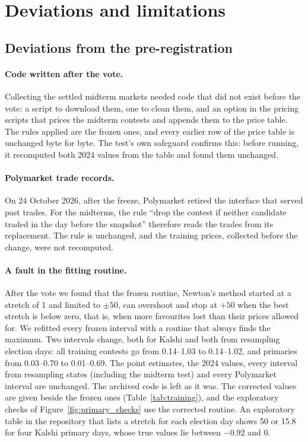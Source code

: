 \section{Deviations and limitations}\label{sec:limitations}

\subsection{Deviations from the pre-registration}

\paragraph{Code written after the vote.} Collecting the settled midterm markets needed code that did not exist before
the vote: a script to download them, one to clean them, and an option in the pricing scripts that prices the midterm
contests and appends them to the price table. The rules applied are the frozen ones, and every earlier row of the price
table is unchanged byte for byte. The test's own safeguard confirms this: before running, it recomputed both 2024
values from the table and found them unchanged.

\paragraph{Polymarket trade records.} On 24 October 2026, after the freeze, Polymarket retired the interface that served
past trades. For the midterms, the rule ``drop the contest if neither candidate traded in the day before the snapshot''
therefore reads the trades from its replacement. The rule is unchanged, and the training prices, collected before the
change, were not recomputed.

\paragraph{A fault in the fitting routine.} After the vote we found that the frozen routine, Newton's method started at
a stretch of 1 and limited to $\pm 50$, can overshoot and stop at $+50$ when the best stretch is below zero, that is,
when more favourites lost than their prices allowed for. We refitted every frozen interval with a routine that always
finds the maximum. Two intervals change, both for Kalshi and both from resampling election days: all training contests
go from 0.14--1.03 to 0.14--1.02, and primaries from 0.03--0.70 to 0.01--0.69. The point estimates, the 2024 values,
every interval from resampling states (including the midterm test) and every Polymarket interval are unchanged. The
archived code is left as it was. The corrected values are given beside the frozen ones (Table~\ref{tab:training}), and
the exploratory checks of Figure~\ref{fig:primary_checks} use the corrected routine. An exploratory table in the
repository that lists a stretch for each election day shows 50 or 15.8 for four Kalshi primary days, whose true values
lie between $-0.92$ and 0.

